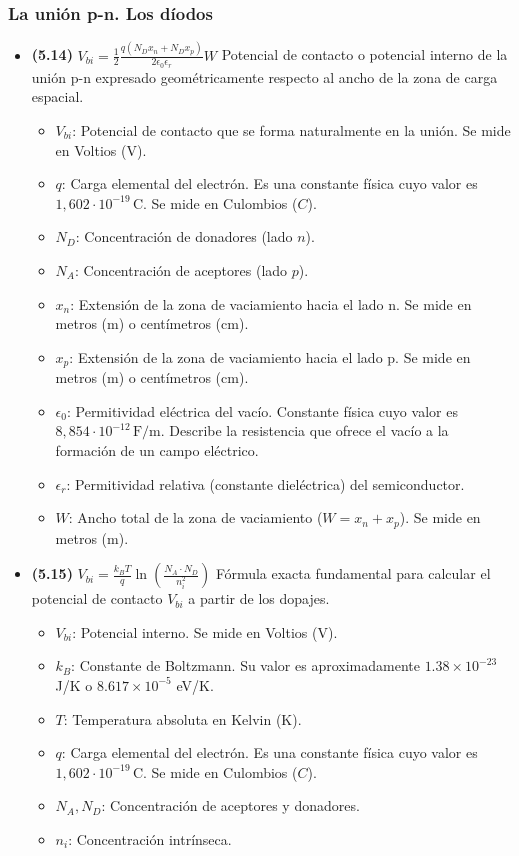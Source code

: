 \documentclass{article}
\begin{document}
		\subsubsection*{La unión p-n. Los díodos}
			\begin{itemize}
				\item \textbf{(5.14)} $\boxed{V_{bi} = \frac{1}{2} \frac{q \left ( N_D x_n + N_D x_p \right )}{2 \epsilon_0 \epsilon_r} W}$ Potencial de contacto o potencial interno de la unión p-n expresado geométricamente respecto al ancho de la zona de carga espacial.
					\begin{itemize}
						\item $V_{bi}$: Potencial de contacto que se forma naturalmente en la unión. Se mide en Voltios (V).
						\item $q$: Carga elemental del electrón. Es una constante física cuyo valor es $1,602\cdot10^{-19}\,\text{C}$. Se mide en Culombios ($C$).
						\item $N_D$: Concentración de donadores (lado $n$).
						\item $N_A$: Concentración de aceptores (lado $p$).
						\item $x_n$: Extensión de la zona de vaciamiento hacia el lado n. Se mide en metros (m) o centímetros (cm).
						\item $x_p$: Extensión de la zona de vaciamiento hacia el lado p. Se mide en metros (m) o centímetros (cm).
						\item $\epsilon_{0}$: Permitividad eléctrica del vacío. Constante física cuyo valor es $8,854\cdot10^{-12}\,\text{F/m}$. Describe la resistencia que ofrece el vacío a la formación de un campo eléctrico.
						\item $\epsilon_r$: Permitividad relativa (constante dieléctrica) del semiconductor.
						\item $W$: Ancho total de la zona de vaciamiento ($W = x_n + x_p$). Se mide en metros (m).
					\end{itemize}

				\item \textbf{(5.15)} $\boxed{V_{bi} = \frac{k_B T}{q} \ln \left( \frac{N_A \cdot N_D}{n_i^2} \right)}$ Fórmula exacta fundamental para calcular el potencial de contacto $V_{bi}$ a partir de los dopajes.
					\begin{itemize}
						\item $V_{bi}$: Potencial interno. Se mide en Voltios (V).
						\item $k_B$: Constante de Boltzmann. Su valor es aproximadamente $1.38 \times 10^{-23}$ J/K o $8.617 \times 10^{-5}$ eV/K.
						\item $T$: Temperatura absoluta en Kelvin (K).
						\item $q$: Carga elemental del electrón. Es una constante física cuyo valor es $1,602\cdot10^{-19}\,\text{C}$. Se mide en Culombios ($C$).
						\item $N_A, N_D$: Concentración de aceptores y donadores.
						\item $n_i$: Concentración intrínseca.
					\end{itemize}


\end{itemize}
\end{document}
